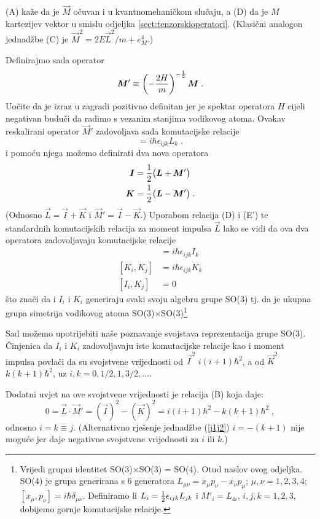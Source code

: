 (A) kaže da je $\vec{M}$ očuvan i u kvantnomehaničkom slučaju, a (D) da
je $M$ kartezijev vektor u smislu odjeljka \ref{sect:tenzorskioperatori}.
(Klasični analogon jednadžbe (C) je $\vec{M}^2 = 2E\vec{L}^2/m + e_{M}^4$.)

Definirajmo sada operator 
\begin{equation}
\vec{M}' \equiv \left(- \frac{2H}{m}\right)^{-\fhalf} \vec{M} \;.
\end{equation}
Uočite da je izraz u zagradi pozitivno definitan jer je spektar operatora $H$
cijeli negativan buduči da radimo s vezanim stanjima vodikovog atoma.
Ovakav reskalirani operator $\vec{M}'$ zadovoljava sada komutacijske
relacije
\begin{equation}
[M'_i, M'_j] = i \hbar \epsilon_{ijk}  L_k \tag{E'} \;.
\end{equation}
i pomoću njega možemo definirati dva nova operatora
\begin{align}
\vec{I} &= \fhalf \big(\vec{L} + \vec{M}'\big) \\
\vec{K} &= \fhalf \big(\vec{L} - \vec{M}'\big) \;.
\end{align}
(Odnosno $\vec{L} = \vec{I} + \vec{K}$ i
$\vec{M}' =  \vec{I} - \vec{K}$.)
Uporabom relacija (D) i (E') te standardnih komutacijskih
relacija za moment impulsa $\vec{L}$ lako se vidi da ova 
dva operatora zadovoljavaju komutacijske relacije
\begin{align}
[I_i, I_j] &= i \hbar \epsilon_{ijk}  I_k \\
[K_i, K_j] &= i \hbar \epsilon_{ijk}  K_k \\
[I_i, K_j] &= 0
\end{align}
što znači da i $I_i$ i $K_i$ generiraju svaki svoju
algebru grupe SO(3) tj. da je ukupna grupa simetrija vodikovog
atoma SO(3)$\times$SO(3)\footnote{Vrijedi grupni identitet
SO(3)$\times$SO(3) = SO(4). Otud naslov ovog odjeljka. 
SO(4) je grupa generirana s 6
generatora $L_{\mu\nu}=x_\mu p_\nu - x_\nu p_\mu$; $\mu, \nu = 1,2,3,4$;
$[x_\mu, p_\nu] = i\hbar \delta_{\mu\nu}$. Definiramo li
$L_i = \frac{1}{2} \epsilon_{ijk} L_{jk}$ i $M'_i = L_{4i}$, $i,j,k = 1,2,3$,
dobijemo gornje komutacijske relacije.}

Sad možemo upotrijebiti naše poznavanje svojstava reprezentacija
grupe SO(3). Činjenica da $I_i$ i $K_i$ zadovoljavaju
iste komutacijske relacije kao i moment impulsa povlači da
su svojstvene vrijednosti od $\vec{I}^2$ $i(i+1)\hbar^2$,
a od $\vec{K}^2$ $k(k+1)\hbar^2$, uz 
$i, k = 0, 1/2, 1, 3/2, ...$.

Dodatni uvjet na ove svojstvene vrijednosti je relacija (B) koja
daje:
\begin{equation}
0 = \vec{L}\cdot\vec{M}' = (\vec{I})^2 - (\vec{K})^2
  = i(i +1)\hbar^2 - k(k +1)\hbar^2 \;,
\label{j1j2}
\end{equation}
odnosno $i = k\equiv j$. (Alternativno rješenje jednadžbe (\ref{j1j2})
$i = - (k +1 )$ nije moguće jer daje negativne svojstvene vrijednosti
za $i$ ili $k$.)


